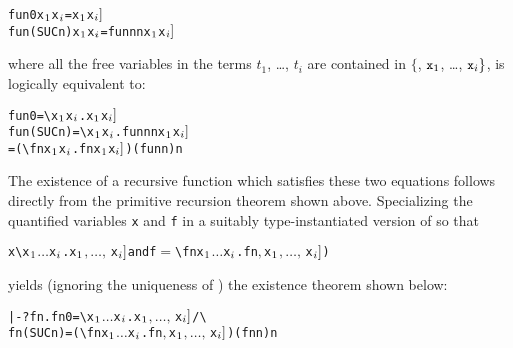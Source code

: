 \begin{hol}\begin{alltt}
   fun 0       x\(\sb{1}\) \m{\dots} x\(\sb{i}\) = \m{f\sb{1}[}x\(\sb{1}\)\m{,\ldots,\,} x\(\sb{i}]\)
   fun (SUC n) x\(\sb{1}\) \m{\dots} x\(\sb{i}\) = \m{f\sb{2}[}fun n  n\m{,} x\(\sb{1}\)\m{,\ldots,\,}x\(\sb{i}]\)
\end{alltt}\end{hol}

\noindent where all the free variables in the  terms $t_1$,
\dots, $t_i$ are contained in $\{$, $\ml{x}_1$, \dots, $\ml{x}_i\}$,
is logically equivalent to:

\begin{hol}\begin{alltt}
   fun 0       = \verb!\!x\(\sb{1}\) \m{\dots} x\(\sb{i}\).\m{f\sb{1}[}x\(\sb{1}\)\m{,\ldots,\,}x\(\sb{i}]\)
   fun (SUC n) = \verb!\!x\(\sb{1}\) \m{\dots} x\(\sb{i}\).\m{f\sb{2}[}fun n  n\m{,}x\(\sb{1}\)\m{,\ldots,\,}x\(\sb{i}]\)
               = (\verb!\!f n x\(\sb{1}\) \m{\dots} x\(\sb{i}\).\m{f\sb{2}[}f  n\m{,} x\(\sb{1}\)\m{,\ldots,\,}x\(\sb{i}]\)) (fun n) n
\end{alltt}\end{hol}

The existence  of  a  recursive  function   which  satisfies these two
equations follows directly from the primitive recursion theorem
 shown above.   Specializing the  quantified variables \verb!x!
and \verb!f!  in  a suitably  type-instantiated version  of  so
that 

\begin{hol}\begin{alltt}
   x\m{=}\verb!\!x\(\sb{1}\) \(\dots\) x\(\sb{i}\).\m{f\sb{1}[}x\(\sb{1}\)\(,\ldots,\,\)x\(\sb{i}]\)  {\rm and}  f\(=\)\verb!\!f n x\(\sb{1}\) \(\dots\) x\(\sb{i}\).\m{f\sb{2}[}f  n\(,\) x\(\sb{1}\)\(,\ldots,\,\)x\(\sb{i}]\))
\end{alltt}\end{hol}

\noindent yields (ignoring the uniqueness of )
the existence theorem shown below:

\begin{hol}\begin{alltt}
   |- ?fn. fn 0       = \verb!\!x\(\sb{1}\) \(\dots\) x\(\sb{i}\).\m{f\sb{1}[}x\(\sb{1}\)\(,\ldots,\,\)x\(\sb{i}]\) /\verb!\!
           fn (SUC n) = (\verb!\!f n x\(\sb{1}\) \(\dots\) x\(\sb{i}\).\m{f\sb{2}[}f  n\(,\) x\(\sb{1}\)\(,\ldots,\,\)x\(\sb{i}]\)) (fn n) n
\end{alltt}\end{hol}

